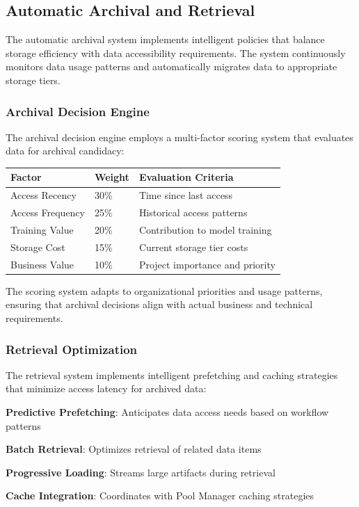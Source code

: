 \subsection*{Automatic Archival and Retrieval}

The automatic archival system implements intelligent policies that balance storage efficiency with data accessibility requirements. The system continuously monitors data usage patterns and automatically migrates data to appropriate storage tiers.

\subsubsection*{Archival Decision Engine}

The archival decision engine employs a multi-factor scoring system that evaluates data for archival candidacy:

\begin{center}
\begin{tabular}{@{}lll@{}}
\toprule
\textbf{Factor} & \textbf{Weight} & \textbf{Evaluation Criteria} \\
\midrule
Access Recency & 30\% & Time since last access \\
Access Frequency & 25\% & Historical access patterns \\
Training Value & 20\% & Contribution to model training \\
Storage Cost & 15\% & Current storage tier costs \\
Business Value & 10\% & Project importance and priority \\
\bottomrule
\end{tabular}
\end{center}

The scoring system adapts to organizational priorities and usage patterns, ensuring that archival decisions align with actual business and technical requirements.

\subsubsection*{Retrieval Optimization}

The retrieval system implements intelligent prefetching and caching strategies that minimize access latency for archived data:

\begin{compactlist}
    \item \textbf{Predictive Prefetching}: Anticipates data access needs based on workflow patterns
    \item \textbf{Batch Retrieval}: Optimizes retrieval of related data items
    \item \textbf{Progressive Loading}: Streams large artifacts during retrieval
    \item \textbf{Cache Integration}: Coordinates with Pool Manager caching strategies
\end{compactlist}

